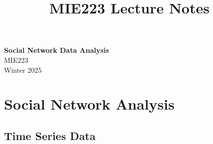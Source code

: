 \documentclass[11pt]{article}
\theoremstyle{definition}
\begin{document}
\setcounter{section}{0}
\title{MIE223 Lecture Notes}

\thispagestyle{empty}

\begin{center}
{\LARGE \bf Social Network Data Analysis}\\
{\large MIE223}\\
Winter 2025
\end{center}
\section{Social Network Analysis}
\subsection{Time Series Data}
\end{document}
